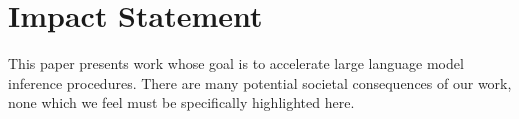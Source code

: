 \section{Impact Statement}

This paper presents work whose goal is to accelerate large language model inference procedures. There are many potential societal consequences of our work, none which we feel must be specifically highlighted here. 